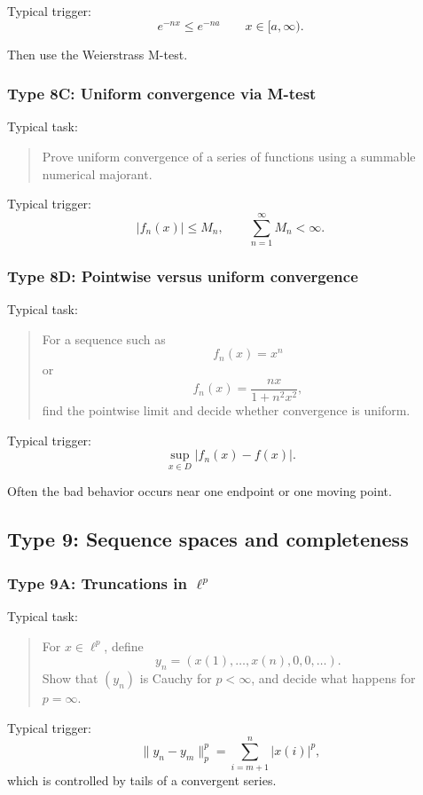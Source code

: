 Typical trigger:
\[
    e^{-nx}\leq e^{-na}
    \qquad x\in[a,\infty).
\]

Then use the Weierstrass M-test.

\subsubsection*{Type 8C: Uniform convergence via M-test}

Typical task:
\begin{quote}
    Prove uniform convergence of a series of functions using a summable numerical majorant.
\end{quote}

Typical trigger:
\[
    |f_n(x)|\leq M_n,
    \qquad
    \sum_{n=1}^\infty M_n<\infty.
\]

\subsubsection*{Type 8D: Pointwise versus uniform convergence}

Typical task:
\begin{quote}
    For a sequence such as
    \[
        f_n(x)=x^n
    \]
    or
    \[
        f_n(x)=\frac{nx}{1+n^2x^2},
    \]
    find the pointwise limit and decide whether convergence is uniform.
\end{quote}

Typical trigger:
\[
    \sup_{x\in D}|f_n(x)-f(x)|.
\]

Often the bad behavior occurs near one endpoint or one moving point.

\subsection{Type 9: Sequence spaces and completeness}

\subsubsection*{Type 9A: Truncations in $\ell^p$}

Typical task:
\begin{quote}
    For $x\in \ell^p$, define
    \[
        y_n=(x(1),\ldots,x(n),0,0,\ldots).
    \]
    Show that $(y_n)$ is Cauchy for $p<\infty$, and decide what happens for $p=\infty$.
\end{quote}

Typical trigger:
\[
    \|y_n-y_m\|_p^p
    =
    \sum_{i=m+1}^n |x(i)|^p,
\]
which is controlled by tails of a convergent series.

